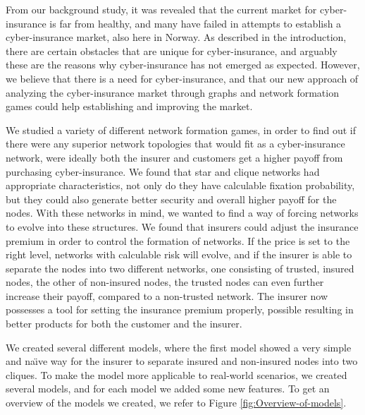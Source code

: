 
From our background study, it was revealed that the current market for cyber-insurance is far from healthy, and many have failed in attempts to establish a cyber-insurance market, also here in Norway. 
As described in the introduction, there are certain obstacles that are unique for cyber-insurance, and arguably these are the reasons why cyber-insurance has not emerged as expected. 
 However, we believe that there is a need for cyber-insurance, and that our new approach of analyzing the cyber-insurance market through graphs and network formation games could help establishing and improving the market.

We studied a variety of different network formation games, in order to find out if there were any superior network topologies that would fit as a cyber-insurance network, were ideally both the insurer and customers get a higher payoff from purchasing cyber-insurance. 
We found that star and clique networks had appropriate characteristics, not only do they have calculable fixation probability, but they could also generate better security and overall higher payoff for the nodes. With these networks in mind, we wanted to find a way of forcing networks to evolve into these structures.  We found that insurers could adjust the insurance premium in order to control the formation of networks. If the price is set to the right level, networks with calculable risk will evolve, and if the insurer is able to separate the nodes into two different networks, one consisting of trusted, insured nodes, the other of non-insured nodes, the trusted nodes can even further increase their payoff, compared to a non-trusted network. The insurer now possesses a tool for setting the insurance premium properly, possible resulting in better products for both the customer and the insurer.


We created several different models, where the first model showed a very simple and na\"{\i}ve way for the insurer to separate insured and non-insured nodes into two cliques. To make the model more applicable to real-world scenarios, we created several models, and for each model we added some new features. To get an overview of the models we created, we refer to Figure \ref{fig:Overview-of-models}.

